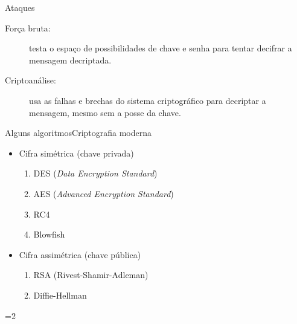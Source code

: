 \begin{frame}{Ataques}

\begin{description}

\item[For\c{c}a bruta:] testa o espa\c{c}o de possibilidades de chave e senha para tentar 
decifrar a mensagem decriptada.

\item[Criptoan\'{a}lise:] usa as falhas e brechas do sistema criptogr\'{a}fico para decriptar 
a mensagem, mesmo sem a posse da chave.
\end{description}
\end{frame}

\begin{frame}{Alguns algoritmos}{Criptografia moderna}

  \begin{itemize}[<+-| alert@+>]
  \item Cifra simétrica (chave privada)
    \begin{enumerate}
    \item DES ({\it Data Encryption Standard})
    \item AES ({\it Advanced Encryption Standard})
    \item RC4
    \item Blowfish
    \end{enumerate}

  \item Cifra assimétrica (chave pública)
    \begin{enumerate}
    \item RSA (Rivest-Shamir-Adleman)
    \item Diffie-Hellman
    \end{enumerate}

  \end{itemize}
  
\end{frame}

=2


\frame{\title{\insertlecture}\maketitle}

